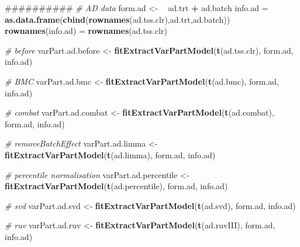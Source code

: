 \documentclass[]{book}
\newenvironment{Shaded}{\begin{snugshade}}{\end{snugshade}}
\newcommand{\KeywordTok}[1]{\textcolor[rgb]{0.13,0.29,0.53}{\textbf{#1}}}
\newcommand{\StringTok}[1]{\textcolor[rgb]{0.31,0.60,0.02}{#1}}
\newcommand{\CommentTok}[1]{\textcolor[rgb]{0.56,0.35,0.01}{\textit{#1}}}
\newcommand{\OperatorTok}[1]{\textcolor[rgb]{0.81,0.36,0.00}{\textbf{#1}}}
\newcommand{\ErrorTok}[1]{\textcolor[rgb]{0.64,0.00,0.00}{\textbf{#1}}}
\newcommand{\NormalTok}[1]{#1}
\begin{document}
\begin{Shaded}
\begin{Highlighting}[]
\NormalTok{##########}
\CommentTok{# AD data}
\NormalTok{form.ad <-}\StringTok{ }\ErrorTok{~}\StringTok{ }\NormalTok{ad.trt }\OperatorTok{+}\StringTok{ }\NormalTok{ad.batch}
\NormalTok{info.ad =}\StringTok{ }\KeywordTok{as.data.frame}\NormalTok{(}\KeywordTok{cbind}\NormalTok{(}\KeywordTok{rownames}\NormalTok{(ad.tss.clr),ad.trt,ad.batch))}
\KeywordTok{rownames}\NormalTok{(info.ad) =}\StringTok{ }\KeywordTok{rownames}\NormalTok{(ad.tss.clr)}

\CommentTok{# before}
\NormalTok{varPart.ad.before <-}\StringTok{ }\KeywordTok{fitExtractVarPartModel}\NormalTok{(}\KeywordTok{t}\NormalTok{(ad.tss.clr), form.ad, info.ad)}

\CommentTok{# BMC}
\NormalTok{varPart.ad.bmc <-}\StringTok{ }\KeywordTok{fitExtractVarPartModel}\NormalTok{(}\KeywordTok{t}\NormalTok{(ad.bmc), form.ad, info.ad)}

\CommentTok{# combat}
\NormalTok{varPart.ad.combat <-}\StringTok{ }\KeywordTok{fitExtractVarPartModel}\NormalTok{(}\KeywordTok{t}\NormalTok{(ad.combat), form.ad, info.ad)}

\CommentTok{# removeBatchEffect}
\NormalTok{varPart.ad.limma <-}\StringTok{ }\KeywordTok{fitExtractVarPartModel}\NormalTok{(}\KeywordTok{t}\NormalTok{(ad.limma), form.ad, info.ad)}

\CommentTok{# percentile normalisation}
\NormalTok{varPart.ad.percentile <-}\StringTok{ }\KeywordTok{fitExtractVarPartModel}\NormalTok{(}\KeywordTok{t}\NormalTok{(ad.percentile), form.ad, info.ad)}

\CommentTok{# svd}
\NormalTok{varPart.ad.svd <-}\StringTok{ }\KeywordTok{fitExtractVarPartModel}\NormalTok{(}\KeywordTok{t}\NormalTok{(ad.svd), form.ad, info.ad)}

\CommentTok{# ruv}
\NormalTok{varPart.ad.ruv <-}\StringTok{ }\KeywordTok{fitExtractVarPartModel}\NormalTok{(}\KeywordTok{t}\NormalTok{(ad.ruvIII), form.ad, info.ad)}



\end{Highlighting}
\end{Shaded}
\end{document}
